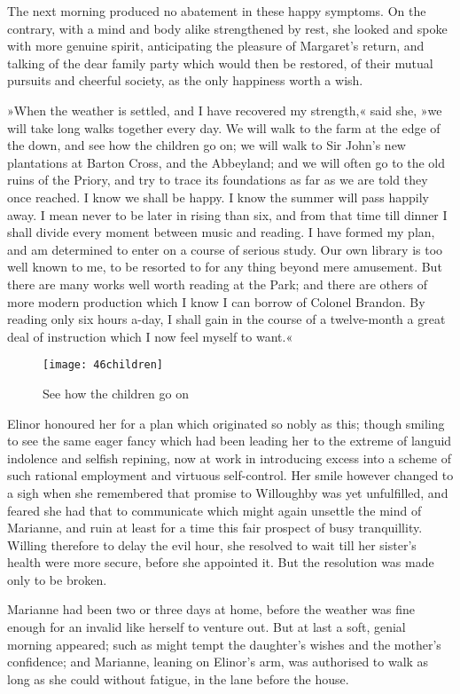 The next morning produced no abatement in these happy symptoms. On the contrary, with a mind and body alike strengthened by rest, she looked and spoke with more genuine spirit, anticipating the pleasure of Margaret’s return, and talking of the dear family party which would then be restored, of their mutual pursuits and cheerful society, as the only happiness worth a wish.

»When the weather is settled, and I have recovered my strength,« said she, »we will take long walks together every day. We will walk to the farm at the edge of the down, and see how the children go on; we will walk to Sir John’s new plantations at Barton Cross, and the Abbeyland; and we will often go to the old ruins of the Priory, and try to trace its foundations as far as we are told they once reached. I know we shall be happy. I know the summer will pass happily away. I mean never to be later in rising than six, and from that time till dinner I shall divide every moment between music and reading. I have formed my plan, and am determined to enter on a course of serious study. Our own library is too well known to me, to be resorted to for any thing beyond mere amusement. But there are many works well worth reading at the Park; and there are others of more modern production which I know I can borrow of Colonel Brandon. By reading only six hours a-day, I shall gain in the course of a twelve-month a great deal of instruction which I now feel myself to want.«

\begin{figure}[tbph]
\centering
\texttt{[image: 46children]}
\caption{See how the children go on}
\end{figure}

Elinor honoured her for a plan which originated so nobly as this; though smiling to see the same eager fancy which had been leading her to the extreme of languid indolence and selfish repining, now at work in introducing excess into a scheme of such rational employment and virtuous self-control. Her smile however changed to a sigh when she remembered that promise to Willoughby was yet unfulfilled, and feared she had that to communicate which might again unsettle the mind of Marianne, and ruin at least for a time this fair prospect of busy tranquillity. Willing therefore to delay the evil hour, she resolved to wait till her sister’s health were more secure, before she appointed it. But the resolution was made only to be broken.

Marianne had been two or three days at home, before the weather was fine enough for an invalid like herself to venture out. But at last a soft, genial morning appeared; such as might tempt the daughter’s wishes and the mother’s confidence; and Marianne, leaning on Elinor’s arm, was authorised to walk as long as she could without fatigue, in the lane before the house.


